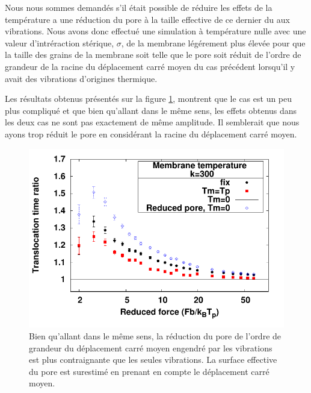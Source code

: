 \newpage

Nous nous sommes demandés s'il était possible de réduire les effets de la température a une réduction du pore à la taille effective de ce dernier du aux vibrations. Nous avons donc effectué une simulation à température nulle avec une valeur d'intréraction stérique, $\sigma$, de la membrane légérement plus élevée pour que la taille des grains de la membrane soit telle que le pore soit réduit de l'ordre de grandeur de la racine du déplacement carré moyen du cas précédent lorsqu'il y avait des vibrations d'origines thermique.
 
Les résultats obtenus présentés sur la figure \ref{reducedpore}, montrent que le cas est un peu plus compliqué et que bien qu'allant dans le même sens, les effets obtenus dans les deux cas ne sont pas exactement de même amplitude. Il semblerait que nous ayons trop réduit le pore en considérant la racine du déplacement carré moyen.


\begin{figure}[H]
\begin{center}
\includegraphics[width=\textwidth]{compkstandarttonotempdifferenttempnew.pdf} 

\caption[Equivalence entre vibrations et pore réduit ?]{Bien qu'allant dans le même sens, la réduction du pore de l'ordre de grandeur du déplacement carré moyen engendré par les vibrations est plus contraignante que les seules vibrations. La surface effective du pore est surestimé en prenant en compte le déplacement carré moyen.}
\label{reducedpore}
\end{center}
\end{figure}

